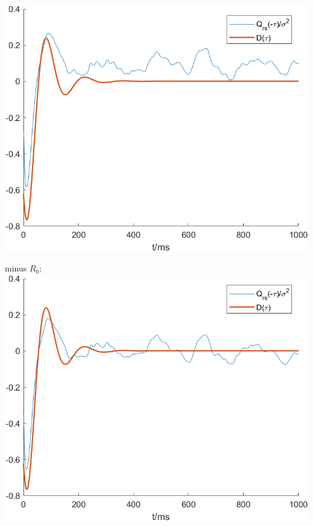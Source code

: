 \documentclass{article}
\begin{document}
\begin{enumerate}
          \includegraphics[scale = 0.8]{pics/Qrs1.png}

          minus $R_0$:\\
          \includegraphics[scale = 0.8]{pics/Qrs2.png}
\end{enumerate}
\end{document}
